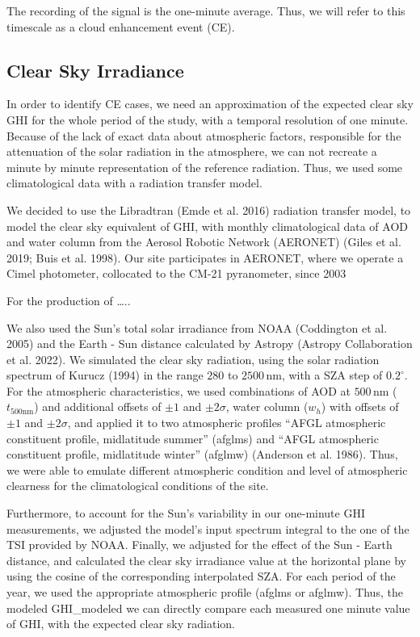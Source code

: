 \documentclass[
]{article}
\begin{document}
The recording of the signal is the one-minute average.
Thus, we will refer to this timescale as a cloud enhancement event (CE).

\hypertarget{clear-sky-irradiance}{%
\subsection{Clear Sky Irradiance}\label{clear-sky-irradiance}}

In order to identify CE cases, we need an approximation of the expected clear sky GHI
for the whole period of the study, with a temporal resolution of one minute. Because
of the lack of exact data about atmospheric factors, responsible for the attenuation
of the solar radiation in the atmosphere, we can not recreate a minute by minute
representation of the reference radiation. Thus, we used some climatological data
with a radiation transfer model.

We decided to use the Libradtran (Emde et al. 2016) radiation transfer model, to model
the clear sky equivalent of GHI, with monthly climatological data of AOD and water
column from the Aerosol Robotic Network (AERONET) (Giles et al. 2019; Buis et al. 1998). Our site
participates in AERONET, where we operate a Cimel photometer, collocated to
the CM-21 pyranometer, since 2003

For the production of \ldots..

We also used the Sun's total solar irradiance from NOAA (Coddington et al. 2005) and the
Earth - Sun distance calculated by Astropy (Astropy Collaboration et al. 2022). We simulated
the clear sky radiation, using the solar radiation spectrum of Kurucz (1994) in the
range \(280\) to \(2500\,\text{nm}\), with a SZA step of \(0.2^\circ\). For the
atmospheric characteristics, we used combinations of AOD at \(500\,\text{nm}\)
(\(t_{500\text{nm}}\)) and additional offsets of \(\pm1\) and \(\pm2\sigma\), water column
(\(w_h\)) with offsets of \(\pm1\) and \(\pm2\sigma\), and applied it to two atmospheric
profiles ``AFGL atmospheric constituent profile, midlatitude summer'' (afglms) and
``AFGL atmospheric constituent profile, midlatitude winter'' (afglmw) (Anderson et al. 1986).
Thus, we were able to emulate different atmospheric condition and level of
atmospheric clearness for the climatological conditions of the site.

Furthermore, to account for the Sun's variability in our one-minute GHI measurements,
we adjusted the model's input spectrum integral to the one of the TSI provided by
NOAA. Finally, we adjusted for the effect of the Sun - Earth distance, and
calculated the clear sky irradiance value at the horizontal plane by using the cosine
of the corresponding interpolated SZA. For each period of the year, we used the
appropriate atmospheric profile (afglms or afglmw). Thus, the modeled GHI\_modeled we
can directly compare each measured one minute value of GHI, with the expected clear
sky radiation.
\end{document}
